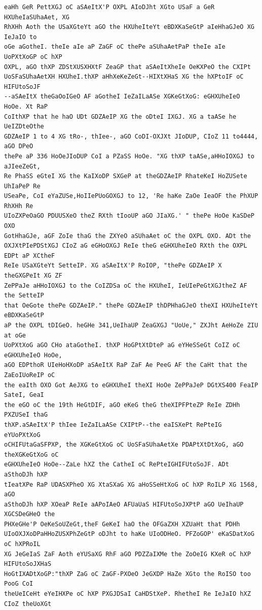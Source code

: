 \documentclass[12pt,a4paper]{article}
\begin{document}
\begin{lstlisting}[caption={Complete text after iteration 4}, label={lst:iter4}]
eaHh GeR PettXGJ oC aSAeItX'P OXPL AIoDJht XGto USaF a GeR HXUheIaSUhaAet, XG
RhXHh Aoth the USaXGteYt aGO the HXUheIteYt eBDXKaSeGtP aIeHhaGJeO XG IeJaIO to
oGe aGotheI. theIe aIe aP ZaGF oC thePe aSUhaAetPaP theIe aIe UoPXtXoGP oC hXP
OXPL, aGO thXP ZDStXUSXHXtF ZeaGP that aSAeItXheIe OeKXPeO the CXIPt
UoSFaSUhaAetXH HXUheI.thXP aHhXeKeZeGt--HIXtXHaS XG the hXPtoIF oC HIFUtoSoJF
--aSAeItX theGaOoIGeO AF aGotheI IeZaILaASe XGKeGtXoG: eGHXUheIeO HoOe. Xt RaP
CoIthXP that he haO UDt GDZAeIP XG the oDteI IXGJ. XG a taASe he UeIZDteOthe
GDZAeIP 1 to 4 XG tRo-, thIee-, aGO CoDI-OXJXt JIoDUP, CIoZ 11 to4444, aGO DPeO
thePe aP 336 HoOeJIoDUP CoI a PZaSS HoOe. "XG thXP taASe,aHHoIOXGJ to aJIeeZeGt,
Re PhaSS eGteI XG the KaIXoDP SXGeP at theGDZAeIP RhateKeI HoZUSete UhIaPeP Re
USeaPe, CoI eYaZUSe,HoIIePUoGOXGJ to 12, 'Re haKe ZaOe IeaOF the PhXUP RhXHh Re
UIoZXPeOaGO PDUUSXeO theZ RXth tIooUP aGO JIaXG.' " thePe HoOe KaSDeP OXO
GotHhaGJe, aGF ZoIe thaG the ZXYeO aSUhaAet oC the OXPL OXO. ADt the
OXJXtPIePDStXGJ CIoZ aG eGHoOXGJ ReIe theG eGHXUheIeO RXth the OXPL EDPt aP XCtheF
ReIe USaXGteYt SetteIP. XG aSAeItX'P RoIOP, "thePe GDZAeIP X theGXGPeIt XG ZF
ZePPaJe aHHoIOXGJ to the CoIZDSa oC the HXUheI, IeUIePeGtXGJtheZ AF the SetteIP
that OeGote thePe GDZAeIP." thePe GDZAeIP thDPHhaGJeO theXI HXUheIteYt eBDXKaSeGtP
aP the OXPL tDIGeO. heGHe 341,UeIhaUP ZeaGXGJ "UoUe," ZXJht AeHoZe ZIU at oGe
UoPXtXoG aGO CHo ataGotheI. thXP HoGPtXtDteP aG eYHeSSeGt CoIZ oC eGHXUheIeO HoOe,
aGO EDPthoR UIeHoHXoDP aSAeItX RaP ZaF Ae PeeG AF the CaHt that the ZaEoIUoReIP oC
the eaIth OXO Got AeJXG to eGHXUheI theXI HoOe ZePPaJeP DGtXS400 FeaIP SateI, GeaI
the eGO oC the 19th HeGtDIF, aGO eKeG theG theXIPFPteZP ReIe ZDHh PXZUSeI thaG
thXP.aSAeItX'P thIee IeZaILaASe CXIPtP--the eaISXePt RePteIG eYUoPXtXoG
oCHIFUtaGaSFPXP, the XGKeGtXoG oC UoSFaSUhaAetXe PDAPtXtDtXoG, aGO theXGKeGtXoG oC
eGHXUheIeO HoOe--ZaLe hXZ the CatheI oC RePteIGHIFUtoSoJF. ADt aSthoDJh hXP
tIeatXPe RaP UDASXPheO XG XtaSXaG XG aHoSSeHtXoG oC hXP RoILP XG 1568, aGO
aSthoDJh hXP XOeaP ReIe aAPoIAeO AFUaUaS HIFUtoSoJXPtP aGO UeIhaUP XGCSDeGHeO the
PHXeGHe'P OeKeSoUZeGt,theF GeKeI haO the OFGaZXH XZUaHt that PDHh
UIoOXJXoDPaHHoZUSXPhZeGtP oDJht to haKe UIoODHeO. PFZoGOP' eKaSDatXoG oC hXPRoIL
XG JeGeIaS ZaF Aoth eYUSaXG RhF aGO PDZZaIXMe the ZoOeIG KXeR oC hXP HIFUtoSoJXHaS
HoGtIXADtXoGP:"thXP ZaG oC ZaGF-PXOeO JeGXDP HaZe XGto the RoISO too PooG CoI
theUeICeHt eYeIHXPe oC hXP PXGJDSaI CaHDStXeP. RhetheI Re IeJaIO hXZ CIoZ theUoXGt

\end{lstlisting}
\end{document}
